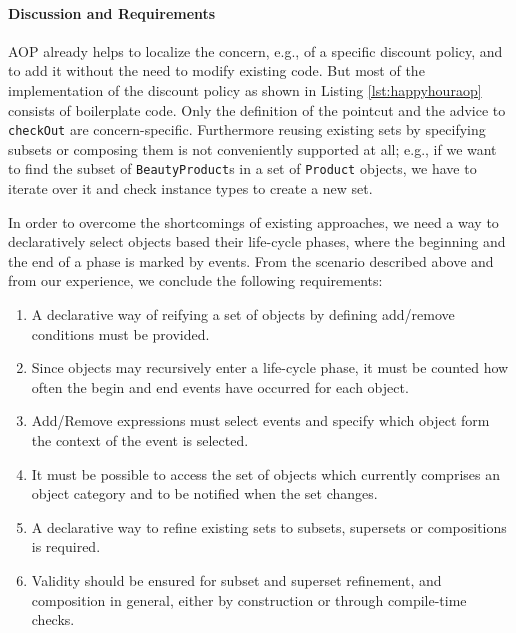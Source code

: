 \paragraph{Discussion and Requirements}

AOP already helps to localize the concern, e.g., of a specific discount policy, and to add it without the need to modify existing code.
But most of the implementation of the discount policy as shown in Listing \ref{lst:happyhouraop} consists of boilerplate code. Only the definition of the pointcut and the advice to \texttt{checkOut} are concern-specific.
Furthermore reusing existing sets by specifying subsets or composing them is not conveniently supported at all; e.g., if we want to find the subset of \texttt{BeautyProduct}s in a set of \texttt{Product} objects, we have to iterate over it and check instance types to create a new set.

In order to overcome the shortcomings of existing approaches, we need a way to declaratively select objects based their life-cycle phases, where the beginning and the end of a phase is marked by events. From the scenario described above and from our experience, we conclude the following requirements:

\begin{enumerate}[{Requirement}1{:}]
\item A declarative way of reifying a set of objects by defining add/remove conditions must be provided.
\item Since objects may recursively enter a life-cycle phase, it must be counted how often the begin and end events have occurred for each object.
\item Add/Remove expressions must select events and specify which object form the context of the event is selected.
\item It must be possible to access the set of objects which currently comprises an object category and to be notified when the set changes.
\item A declarative way to refine existing sets to subsets, supersets or compositions is required.
\item Validity should be ensured for subset and superset refinement, and composition in general, either by construction or through compile-time checks.
\end{enumerate}
